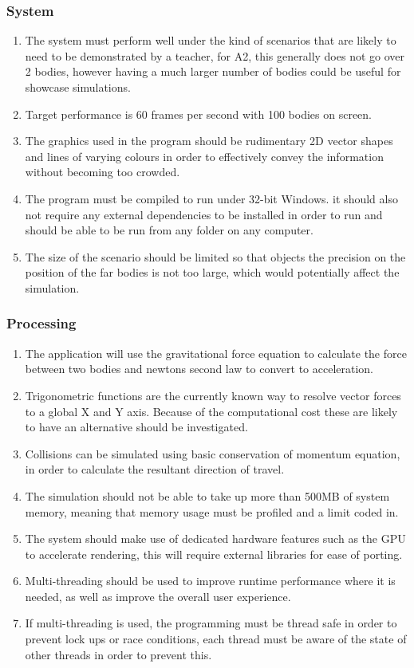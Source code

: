 \subsubsection{System}
\begin{enumerate}
\item The system must perform well under the kind of scenarios that are likely to need to be demonstrated by a teacher, for A2, this generally does not go over 2 bodies, however having a much larger number of bodies could be useful for showcase simulations.
\item Target performance is 60 frames per second with 100 bodies on screen.
\item The graphics used in the program should be rudimentary 2D vector shapes and lines of varying colours in order to effectively convey the information without becoming too crowded.
\item The program must be compiled to run under 32-bit Windows. it should also not require any external dependencies to be installed in order to run and should be able to be run from any folder on any computer.
\item The size of the scenario should be limited so that objects the precision on the position of the far bodies is not too large, which would potentially affect the simulation.
\end{enumerate}

\subsubsection{Processing}
\begin{enumerate}
\item The application will use the gravitational force equation to calculate the force between two bodies and newtons second law to convert to acceleration.
\item Trigonometric functions are the currently known way to resolve vector forces to a global X and Y axis. Because of the computational cost these are likely to have an alternative should be investigated.
\item Collisions can be simulated using basic conservation of momentum equation, in order to calculate the resultant direction of travel.
\item The simulation should not be able to take up more than 500MB of system memory, meaning that memory usage must be profiled and a limit coded in.
\item The system should make use of dedicated hardware features such as the GPU to accelerate rendering, this will require external libraries for ease of porting.
\item Multi-threading should be used to improve runtime performance where it is needed, as well as improve the overall user experience.
\item If multi-threading is used, the programming must be thread safe in order to prevent lock ups or race conditions, each thread must be aware of the state of other threads in order to prevent this.
\end{enumerate}

